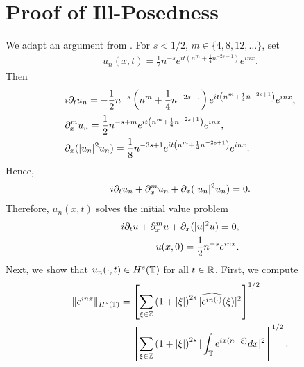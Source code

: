 \section{Proof of Ill-Posedness}
We adapt an argument from \cite{Burq_Gerad_Tzvetkov-An-instability-}. For $s<1/2$, $m \in \{4, 8, 12, \dots\}$, set
%
%
%
%
\begin{equation}
	\label{1ill-soln}
	\begin{split}
		u_{n}(x,t)=\frac{1}{2}n^{-s}e^{it\left( n^{m}+\frac{1}{4}n^{-2s+1}
		\right)}e^{inx}.
	\end{split}
\end{equation}
%
%
Then
%
%
\begin{equation*}
	\begin{split}
		& i \partial_t u_{n}
		= -\frac{1}{2}n^{-s}\left( n^{m}+\frac{1}{4}n^{-2s+1} \right)e^{it\left(
		n^{m}+ \frac{1}{4}n^{-2s+1} \right)}e^{inx},
		\\
		& \partial_x^{m}u_{n}  = \frac{1}{2}n^{-s+m}e^{it\left(
		n^{m}+\frac{1}{4}n^{-2s+1} \right)}e^{inx},
		\\
		& \partial_x (| u_{n} |^{2}u_{n})  = \frac{1}{8}n^{-3s+1}e^{it\left(
		n^{m}+\frac{1}{4}n^{-2s+1} \right)}e^{inx}.
	\end{split}
\end{equation*}
%
%
Hence,
%
%
\begin{equation*}
	\begin{split}
		i \partial_t u_{n} + \partial_x^{m}u_{n} + \partial_x(| u_{n} |^{2} u_{n})
		=0.
	\end{split}
\end{equation*}
%
%
Therefore, $u_{n}(x,t)$ solves the initial value problem
%
%
\begin{gather*}
	\begin{split}
		i \partial_t u + \partial_x^m u + \partial_x (| u |^{2}u) = 0,
		\\
		u(x,0) = \frac{1}{2}n^{-s}e^{inx}.
	\end{split}
\end{gather*}
%
%
Next, we show that $u_{n}(\cdot, t) \in H^{s}(\mathbb{T})$ for all $t \in \mathbb{R}$.
First, we compute
%
%
\begin{equation*}
	\begin{split}
		\|e^{inx}\|_{H^{s}(\mathbb{T})}
		& =  \left[ \sum_{\xi \in \mathbb{Z}} \left( 1+ | \xi |
		\right)^{2s} | \widehat{e^{in(\cdot)}}(\xi) |^{2} \right]^{1/2}
		\\
		& =  \left[ \sum_{\xi \in \mathbb{Z}} \left( 1 + | \xi | \right)^{2s} |
		\int_{\mathbb{T}}e^{ix(n- \xi)}dx |^{2}\right]^{1/2}.
	\end{split}
\end{equation*}
